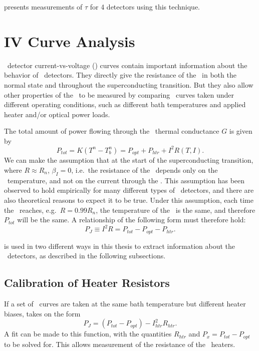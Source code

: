  presents measurements of $\tau$ for 4 detectors using this technique.

\section{\textsc{IV} Curve Analysis} \label{sec:ch3-iv-curve}

\TES\ detector current-vs-voltage (\IV) curves contain important information about the behavior of \TES\ detectors.
They directly give the resistance of the \TES\ in both the normal state and throughout the superconducting transition.
But they also allow other properties of the \TES\ to be measured by comparing \IV\ curves taken under different operating conditions, such as different bath temperatures and applied heater and/or optical power loads.

The total amount of power flowing through the \TES\ thermal conductance $G$ is given by
\begin{equation}\label{eqn:ch3-tes-ptot}
P_{tot} = K(T^n - T_b^n) = P_{opt} + P_{htr} + I^2 R(T,I).
\end{equation}
We can make the assumption that at the start of the superconducting transition, where $R \approx R_n$, $\beta_I = 0$, i.e.\ the resistance of the \TES\ depends only on the \TES\ temperature, and not on the current through the \TES.
This assumption has been observed to hold empirically for many different types of \TES\ detectors, and there are also theoretical reasons to expect it to be true\cite{bennett_resistance_2013}.
Under this assumption, each time the \TES\ reaches, e.g.\ $R = 0.99R_n$, the temperature of the \TES\ is the same, and therefore $P_{tot}$ will be the same.
A relationship of the following form must therefore hold:
\begin{equation}\label{eqn:ch3-tes-99Rn}
P_{J} \equiv I^2 R = P_{tot} - P_{opt} - P_{htr}.
\end{equation}

 is used in two different ways in this thesis to extract information about the \TES\ detectors, as described in the following subsections.

\subsection{Calibration of Heater Resistors}

If a set of \IV\ curves are taken at the same bath temperature but different heater biases,  takes on the form
\begin{equation}\label{eqn:ch3-rhtr-fit}
P_J = (P_{tot} - P_{opt}) - I_{htr}^2 R_{htr}.
\end{equation}
A fit can be made to this function, with the quantities $R_{htr}$ and $P_x = P_{tot} - P_{opt}$ to be solved for.
This allows measurement of the resistance of the \TES\ heaters.

